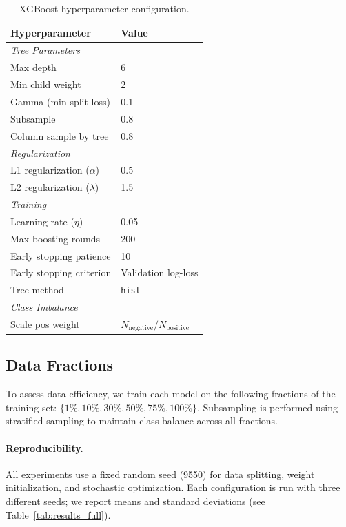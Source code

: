 \documentclass{article}
\theoremstyle{plain}
\theoremstyle{definition}
\theoremstyle{remark}
\begin{document}
\begin{table}[h]
\centering
\caption{XGBoost hyperparameter configuration.}
\label{tab:xgboost_config}
\begin{tabular}{ll}
\toprule
Hyperparameter & Value \\
\midrule
\multicolumn{2}{l}{\textit{Tree Parameters}} \\
Max depth & 6 \\
Min child weight & 2 \\
Gamma (min split loss) & 0.1 \\
Subsample & 0.8 \\
Column sample by tree & 0.8 \\
\midrule
\multicolumn{2}{l}{\textit{Regularization}} \\
L1 regularization ($\alpha$) & 0.5 \\
L2 regularization ($\lambda$) & 1.5 \\
\midrule
\multicolumn{2}{l}{\textit{Training}} \\
Learning rate ($\eta$) & 0.05 \\
Max boosting rounds & 200 \\
Early stopping patience & 10 \\
Early stopping criterion & Validation log-loss \\
Tree method & \texttt{hist} \\
\midrule
\multicolumn{2}{l}{\textit{Class Imbalance}} \\
Scale pos weight & $N_{\text{negative}} / N_{\text{positive}}$ \\
\bottomrule
\end{tabular}
\end{table}



\subsection{Data Fractions}
\label{appendix:fractions}

To assess data efficiency, we train each model on the following fractions of the training set: $\{1\%, 10\%, 30\%, 50\%, 75\%, 100\%\}$. Subsampling is performed using stratified sampling to maintain class balance across all fractions.

\paragraph{Reproducibility.}
All experiments use a fixed random seed (9550) for data splitting, weight initialization, and stochastic optimization. Each configuration is run with three different seeds; we report means and standard deviations (see Table~\ref{tab:results_full}).
\end{document}
